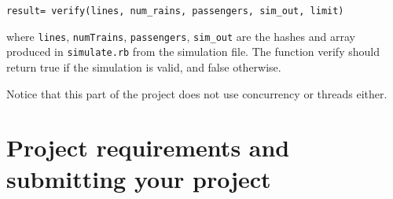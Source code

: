 \documentclass[11pt]{article}
\begin{document}
      \begin{center}

        \texttt{result= verify(lines, num\_rains, passengers, sim\_out, limit)}

      \end{center}

      \vspace{-1.5mm}

    \noindent
    where \texttt{lines}, \texttt{numTrains}, \texttt{passengers},
    \texttt{sim\_out} are the hashes and array produced in
    \texttt{simulate.rb} from the simulation file.  The function verify
    should return true if the simulation is valid, and false otherwise.

      Notice that this part of the project does not use concurrency or threads
    either.

    \enlargethispage{3mm}

  \section{Project requirements and submitting your
           project\label{section:requirements}}
\end{document}
